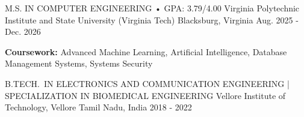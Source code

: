 
\begin{cventries}

\cventry
  {M.S. IN COMPUTER ENGINEERING • GPA: 3.79/4.00}%
  {Virginia Polytechnic Institute and State University (Virginia Tech)}%
  {Blacksburg, Virginia}%
  {Aug. 2025 - Dec. 2026}%
  {
    \begin{cvitems}%
      \item {\textbf{Coursework:} Advanced Machine Learning, Artificial Intelligence, Database Management Systems, Systems Security}%
    \end{cvitems}%
  }

\cventry
  {B.TECH.\ IN ELECTRONICS AND COMMUNICATION ENGINEERING | SPECIALIZATION IN BIOMEDICAL ENGINEERING}%
  {Vellore Institute of Technology, Vellore}%
  {Tamil Nadu, India}%
  {2018 - 2022}%
  {%
  }


\end{cventries}
